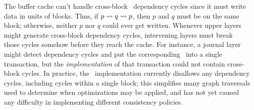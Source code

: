The buffer cache can't handle cross-block \patch\ dependency cycles since
it must write data in units of blocks.
%
Thus, if $p \leadsto q \leadsto p$, then $p$ and $q$ must be on the same
block; otherwise, neither $p$ nor $q$ could ever get written.
%
Whenever upper layers might generate cross-block dependency cycles,
intervening layers must break those cycles somehow before they reach the
cache.
%
For instance, a journal layer might detect dependency cycles and put the
corresponding \patches\ into a single transaction, but the
\emph{implementation} of that transaction could not contain cross-block
cycles.
%
In practice, the \Kudos\ implementation currently disallows any dependency
cycles, including cycles within a single block; this simplifies many graph
traversals used to determine when optimizations may be applied, and has not
yet caused any difficulty in implementing different consistency policies.



